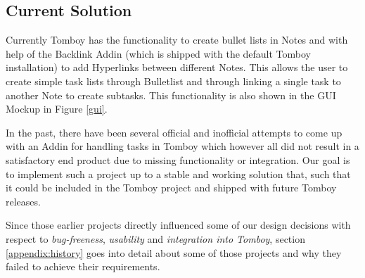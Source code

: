 \subsection{Current Solution}
\label{description:solution}
Currently Tomboy has the functionality to create bullet lists in Notes and with help of the Backlink Addin (which is shipped with the default Tomboy installation) to add Hyperlinks between different Notes. This allows the user to create simple task lists through Bulletlist and through linking a single task to another Note to create subtasks. This functionality is also shown in the GUI Mockup in Figure \ref{gui}.

In the past, there have been several official and inofficial attempts to come up with an Addin for handling tasks in Tomboy which however all did not result in a satisfactory end product due to missing functionality or integration. Our goal is to implement such a project up to a stable and working solution that, such that it could be included in the Tomboy project and shipped with future Tomboy releases. 

Since those earlier projects directly influenced some of our design decisions with respect to \textit{bug-freeness}, \textit{usability} and \textit{integration into Tomboy}, section \ref{appendix:history} goes into detail about some of those projects and why they failed to achieve their requirements.


